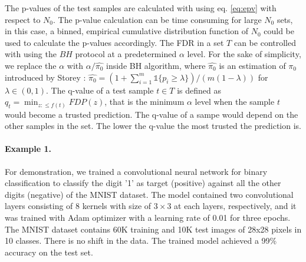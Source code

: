 \documentclass{article}
\newcommand{\mathone}{\mathds{1}}
\begin{document}
The p-values of the test samples are calculated with using eq. \ref{eq:epv} with respect to $N_0$. The p-value calculation can be time consuming for large $N_0$ sets, in this case, a binned, empirical cumulative distribution function of $N_0$ could be used to calculate the p-values accordingly. The FDR in a set $T$ can be controlled with using the $BH$ protocol at a predetermined $\alpha$ level. For the sake of simplicity, we replace the $\alpha$ with $\alpha/\hat{\pi_0}$ inside BH algorithm, where $\hat{\pi_0}$ is an estimation of $\pi_0$ introduced by Storey \cite{storey2004strong}: $\hat{\pi_0} = (1+\sum_{i=1}^m \mathone\{p_i\ge\lambda\} )/(m(1-\lambda))$ for $\lambda\in (0,1)$. The q-value of a test sample $t\in T$ is defined as $q_t=\min_{z:\le f(t)}FDP( z )$, that is the minimum $\alpha$ level when the sample $t$ would become a trusted prediction. The q-value of a sampe would depend on the other samples in the set. The lower the q-value the most trusted the prediction is.


\paragraph{Example 1.} For demonstration, we trained a convolutional neural network for binary classification to classify the digit '1' as target (positive) against all the other digits (negative) of the MNIST dataset. The model contained two convolutional layers consisting of 8 kernels with size of $3\times3$ at each layers, respectively, and it was trained with Adam optimizer with a learning rate of 0.01 for three epochs. The MNIST dataset contains 60K training and 10K test images of 28x28 pixels in 10 classes. There is no shift in the data. The trained model achieved a 99\% accuracy on the test set.
\end{document}
